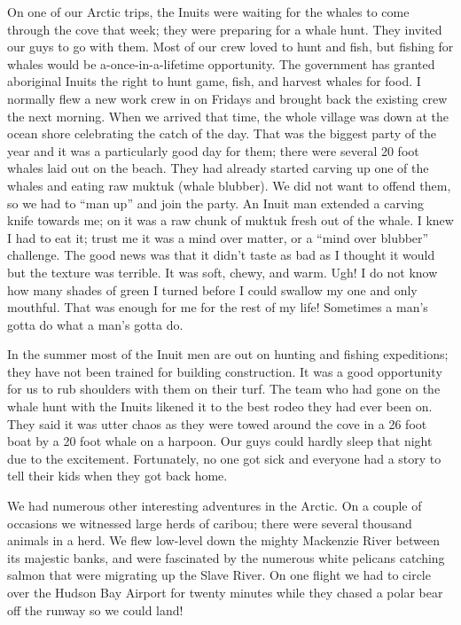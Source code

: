 \documentclass[twoside, 12pt]{book}
\begin{document}
On one of our Arctic trips, the Inuits were waiting for the whales to come through the cove that week; they were preparing for a whale hunt. They invited our guys to go with them. Most of our crew loved to hunt and fish, but fishing for whales would be a-once-in-a-lifetime opportunity. The government has granted aboriginal Inuits the right to hunt game, fish, and harvest whales for food. I normally flew a new work crew in on Fridays and brought back the existing crew the next morning. When we arrived that time, the whole village was down at the ocean shore celebrating the catch of the day. That was the biggest party of the year and it was a particularly good day for them; there were several 20 foot whales laid out on the beach. They had already started carving up one of the whales and eating raw muktuk (whale blubber). We did not want to offend them, so we had to “man up” and join the party. An Inuit man extended a carving knife towards me; on it was a raw chunk of muktuk fresh out of the whale. I knew I had to eat it; trust me it was a mind over matter, or a “mind over blubber” challenge. The good news was that it didn't taste as bad as I thought it would but the texture was terrible. It was soft, chewy, and warm. Ugh! I do not know how many shades of green I turned before I could swallow my one and only mouthful. That was enough for me for the rest of my life! Sometimes a man’s gotta do what a man’s gotta do. 

In the summer most of the Inuit men are out on hunting and fishing expeditions; they have not been trained for building construction. It was a good opportunity for us to rub shoulders with them on their turf. The team who had gone on the whale hunt with the Inuits likened it to the best rodeo they had ever been on. They said it was utter chaos as they were towed around the cove in a 26 foot boat by a 20 foot whale on a harpoon. Our guys could hardly sleep that night due to the excitement. Fortunately, no one got sick and everyone had a story to tell their kids when they got back home.

We had numerous other interesting adventures in the Arctic. On a couple of occasions we witnessed large herds of caribou; there were several thousand animals in a herd. We flew low-level down the mighty Mackenzie River between its majestic banks, and were fascinated by the numerous white pelicans catching salmon that were migrating up the Slave River. On one flight we had to circle over the Hudson Bay Airport for twenty minutes while they chased a polar bear off the runway so we could land! 
\end{document}
